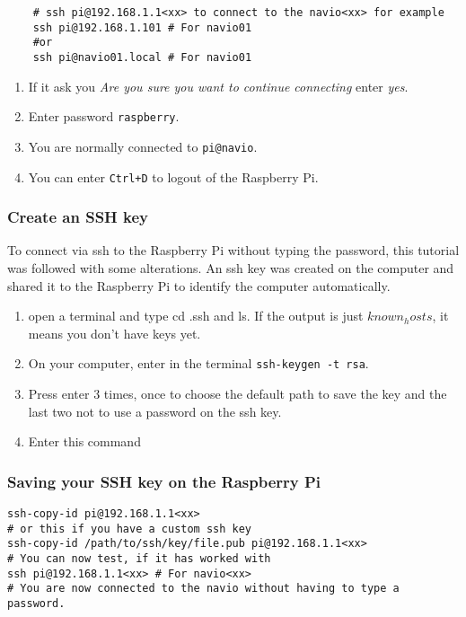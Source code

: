 \begin{verbatim}
    # ssh pi@192.168.1.1<xx> to connect to the navio<xx> for example
    ssh pi@192.168.1.101 # For navio01
    #or
    ssh pi@navio01.local # For navio01

                \end{verbatim}

\begin{enumerate}
    \item If it ask you \emph{Are you sure you want to continue connecting} enter \emph{yes}.
    \item Enter password \texttt{raspberry}.
    \item You are normally connected to \texttt{pi@navio}.
    \item You can enter \texttt{Ctrl+D} to logout of the Raspberry Pi.
\end{enumerate}

\subsubsection{Create an SSH key}
To connect via ssh to the Raspberry Pi without typing the password, this tutorial \cite{ssh_ssh_copy_id} was followed with some alterations. An ssh key was created on the computer and shared it to the Raspberry Pi to identify the computer automatically.

\begin{enumerate}
    \item open a terminal and type cd .ssh and ls. If the output is just $known_hosts$, it means you don't have keys yet.
    \item On your computer, enter in the terminal \texttt{ssh-keygen -t rsa}.
    \item Press enter 3 times, once to choose the default path to save the key and the last two not to use a password on the ssh key.
    \item Enter this command
\end{enumerate}

\subsubsection{Saving your SSH key on the Raspberry Pi}

\begin{verbatim}
ssh-copy-id pi@192.168.1.1<xx>
# or this if you have a custom ssh key
ssh-copy-id /path/to/ssh/key/file.pub pi@192.168.1.1<xx>
# You can now test, if it has worked with
ssh pi@192.168.1.1<xx> # For navio<xx>
# You are now connected to the navio without having to type a password.
                \end{verbatim}

